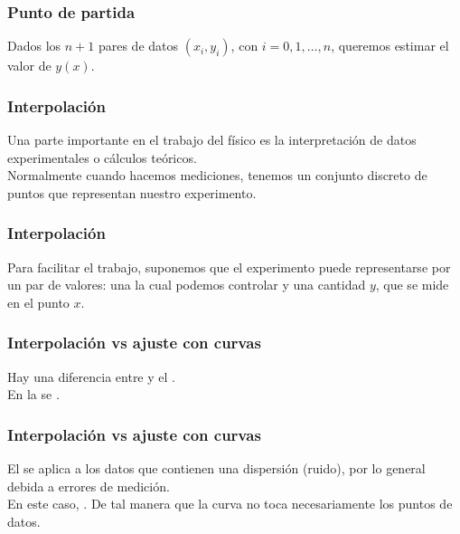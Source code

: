 \documentclass[12pt]{beamer}
\begin{document}
\begin{frame}
\frametitle{Punto de partida}
Dados los $n + 1$ pares de datos $(x_{i}, y_{i})$, con $i = 0, 1 , \ldots, n$, queremos estimar el valor de $y (x)$.
\end{frame}
\begin{frame}
\frametitle{Interpolación}
Una parte importante en el trabajo del físico es la interpretación de datos experimentales o cálculos teóricos.
\\
\bigskip
\pause
Normalmente cuando hacemos mediciones, tenemos un conjunto discreto de puntos que representan nuestro experimento.
\end{frame}
\begin{frame}
\frametitle{Interpolación}
Para facilitar el trabajo, suponemos que el experimento puede representarse por un par de valores: una  la cual podemos controlar y una cantidad $y$, que se mide en el punto $x$.
\end{frame}
\begin{frame}
\frametitle{Interpolación vs ajuste con curvas}
Hay una diferencia entre  y el .
\\
\bigskip
\pause
En la  \pause se \emph{}.
\end{frame}
\begin{frame}
\frametitle{Interpolación vs ajuste con curvas}
El  se aplica a los datos que contienen una dispersión (ruido), por lo general debida a errores de medición.
\\
\bigskip
\pause
En este caso, . \pause De tal manera que la curva no toca necesariamente los puntos de datos.
\end{frame}
\end{document}
